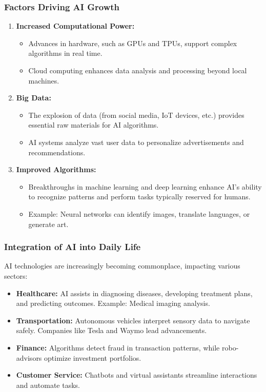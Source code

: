 \documentclass[aspectratio=169]{beamer}
\begin{document}
\begin{frame}[fragile]
    \frametitle{Factors Driving AI Growth}
    \begin{enumerate}
        \item \textbf{Increased Computational Power:}
        \begin{itemize}
            \item Advances in hardware, such as GPUs and TPUs, support complex algorithms in real time.
            \item Cloud computing enhances data analysis and processing beyond local machines.
        \end{itemize}
        
        \item \textbf{Big Data:}
        \begin{itemize}
            \item The explosion of data (from social media, IoT devices, etc.) provides essential raw materials for AI algorithms.
            \item AI systems analyze vast user data to personalize advertisements and recommendations.
        \end{itemize}

        \item \textbf{Improved Algorithms:}
        \begin{itemize}
            \item Breakthroughs in machine learning and deep learning enhance AI’s ability to recognize patterns and perform tasks typically reserved for humans.
            \item Example: Neural networks can identify images, translate languages, or generate art.
        \end{itemize}
    \end{enumerate}
\end{frame}

\begin{frame}[fragile]
    \frametitle{Integration of AI into Daily Life}
    AI technologies are increasingly becoming commonplace, impacting various sectors:
    \begin{itemize}
        \item \textbf{Healthcare:} AI assists in diagnosing diseases, developing treatment plans, and predicting outcomes. Example: Medical imaging analysis.
        
        \item \textbf{Transportation:} Autonomous vehicles interpret sensory data to navigate safely. Companies like Tesla and Waymo lead advancements.
        
        \item \textbf{Finance:} Algorithms detect fraud in transaction patterns, while robo-advisors optimize investment portfolios.
        
        \item \textbf{Customer Service:} Chatbots and virtual assistants streamline interactions and automate tasks.
    \end{itemize}
\end{frame}
\end{document}
